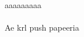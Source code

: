 \documentclass{article}
\begin{document}
\paragraph{}aaaaaaaaa
\paragraph{}Ae krl push papeeria
\end{document}
